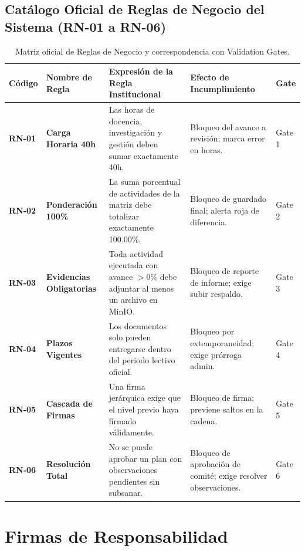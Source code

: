 \documentclass[12pt,a4paper]{article}
\begin{document}
\subsection{Catálogo Oficial de Reglas de Negocio del Sistema (RN-01 a RN-06)}
\begin{table}[H]
\centering
\small
\renewcommand{\arraystretch}{1.2}
\begin{tabularx}{\textwidth}{|>{\hsize=0.3\hsize\centering\arraybackslash\footnotesize}X|>{\hsize=0.8\hsize\raggedright\arraybackslash\bfseries\footnotesize}X|>{\hsize=1.4\hsize\raggedright\arraybackslash\footnotesize}X|>{\hsize=1.1\hsize\raggedright\arraybackslash\footnotesize}X|>{\hsize=0.4\hsize\centering\arraybackslash\footnotesize}X|}
\hline
\rowcolor{tableheader}
\textbf{Código} & \textbf{Nombre de Regla} & \textbf{Expresión de la Regla Institucional} & \textbf{Efecto de Incumplimiento} & \textbf{Gate} \\
\hline
\textbf{RN-01} & Carga Horaria 40h & Las horas de docencia, investigación y gestión deben sumar exactamente 40h. & Bloqueo del avance a revisión; marca error en horas. & Gate 1 \\
\hline
\textbf{RN-02} & Ponderación 100\% & La suma porcentual de actividades de la matriz debe totalizar exactamente 100.00\%. & Bloqueo de guardado final; alerta roja de diferencia. & Gate 2 \\
\hline
\textbf{RN-03} & Evidencias Obligatorias & Toda actividad ejecutada con avance $>0\%$ debe adjuntar al menos un archivo en MinIO. & Bloqueo de reporte de informe; exige subir respaldo. & Gate 3 \\
\hline
\textbf{RN-04} & Plazos Vigentes & Los documentos solo pueden entregarse dentro del periodo lectivo oficial. & Bloqueo por extemporaneidad; exige prórroga admin. & Gate 4 \\
\hline
\textbf{RN-05} & Cascada de Firmas & Una firma jerárquica exige que el nivel previo haya firmado válidamente. & Bloqueo de firma; previene saltos en la cadena. & Gate 5 \\
\hline
\textbf{RN-06} & Resolución Total & No se puede aprobar un plan con observaciones pendientes sin subsanar. & Bloqueo de aprobación de comité; exige resolver observaciones. & Gate 6 \\
\hline
\end{tabularx}
\caption{Matriz oficial de Reglas de Negocio y correspondencia con Validation Gates.}
\label{tab:reglas_negocio_matrix}
\end{table}

\section{Firmas de Responsabilidad}
\end{document}
